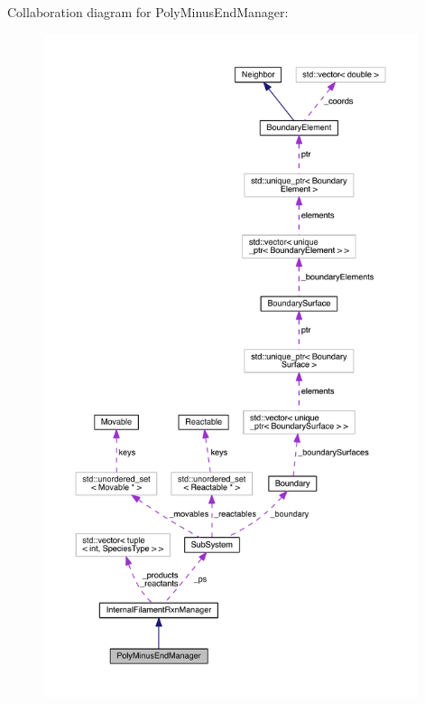 Collaboration diagram for Poly\+Minus\+End\+Manager\+:
\nopagebreak
\begin{figure}[H]
\begin{center}
\leavevmode
\includegraphics[height=550pt]{classPolyMinusEndManager__coll__graph}
\end{center}
\end{figure}
